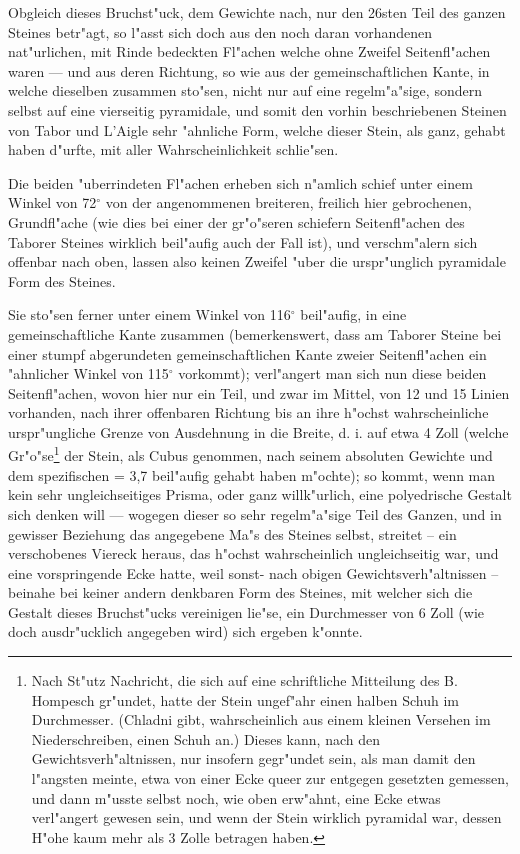\documentclass[a4paper, 11pt, oneside, german]{article}
\begin{document}
Obgleich dieses Bruchst"uck, dem Gewichte nach, nur den 26sten Teil des ganzen Steines betr"agt, so l"asst sich doch aus den noch daran vorhandenen nat"urlichen, mit Rinde bedeckten Fl"achen welche ohne Zweifel Seitenfl"achen waren --- und aus deren Richtung, so wie aus der gemeinschaftlichen Kante, in welche dieselben zusammen sto"sen, nicht nur auf eine regelm"a"sige, sondern selbst auf eine vierseitig pyramidale, und somit den vorhin beschriebenen Steinen von Tabor und L'Aigle sehr "ahnliche Form, welche dieser Stein, als ganz, gehabt haben d"urfte, mit aller Wahrscheinlichkeit schlie"sen.

Die beiden "uberrindeten Fl"achen erheben sich n"amlich schief unter einem Winkel von 72$^{\circ}$ von der angenommenen breiteren, freilich hier gebrochenen, Grundfl"ache (wie dies bei einer der gr"o"seren schiefern Seitenfl"achen des Taborer Steines wirklich beil"aufig auch der Fall ist), und verschm"alern sich offenbar nach oben, lassen also keinen Zweifel "uber die urspr"unglich pyramidale Form des Steines.

Sie sto"sen ferner unter einem Winkel von 116$^{\circ}$ beil"aufig, in eine gemeinschaftliche Kante zusammen (bemerkenswert, dass am Taborer Steine bei einer stumpf abgerundeten gemeinschaftlichen Kante zweier Seitenfl"achen ein "ahnlicher Winkel von 115$^{\circ}$ vorkommt); verl"angert man sich nun diese beiden Seitenfl"achen, wovon hier nur ein Teil, und zwar im Mittel, von 12 und 15 Linien vorhanden, nach ihrer offenbaren Richtung bis an ihre h"ochst wahrscheinliche urspr"ungliche Grenze von Ausdehnung in die Breite, d. i. auf etwa 4 Zoll (welche Gr"o"se\footnote{Nach St"utz Nachricht, die sich auf eine schriftliche Mitteilung des B. Hompesch gr"undet, hatte der Stein ungef"ahr einen halben Schuh im Durchmesser. (Chladni gibt, wahrscheinlich aus einem kleinen Versehen im Niederschreiben, einen Schuh an.) Dieses kann, nach den Gewichtsverh"altnissen, nur insofern gegr"undet sein, als man damit den l"angsten meinte, etwa von einer Ecke queer zur entgegen gesetzten gemessen, und dann m"usste selbst noch, wie oben erw"ahnt, eine Ecke etwas verl"angert gewesen sein, und wenn der Stein wirklich pyramidal war, dessen H"ohe kaum mehr als 3 Zolle betragen haben.} der Stein, als Cubus genommen, nach seinem absoluten Gewichte und dem spezifischen = 3,7 beil"aufig gehabt haben m"ochte); so kommt, wenn man kein sehr ungleichseitiges Prisma, oder ganz willk"urlich, eine polyedrische Gestalt sich denken will --- wogegen dieser so sehr regelm"a"sige Teil des Ganzen, und in gewisser Beziehung das angegebene Ma"s des Steines selbst, streitet -- ein verschobenes Viereck heraus, das h"ochst wahrscheinlich ungleichseitig war, und eine vorspringende Ecke hatte, weil sonst- nach obigen Gewichtsverh"altnissen -- beinahe bei keiner andern denkbaren Form des Steines, mit welcher sich die Gestalt dieses Bruchst"ucks vereinigen lie"se, ein Durchmesser von 6 Zoll (wie doch ausdr"ucklich angegeben wird) sich ergeben k"onnte.
\end{document}

